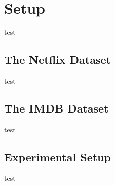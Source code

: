\section{Setup}
test
\subsection{The Netflix Dataset}
test
\subsection{The IMDB Dataset}
test
\subsection{Experimental Setup}
test